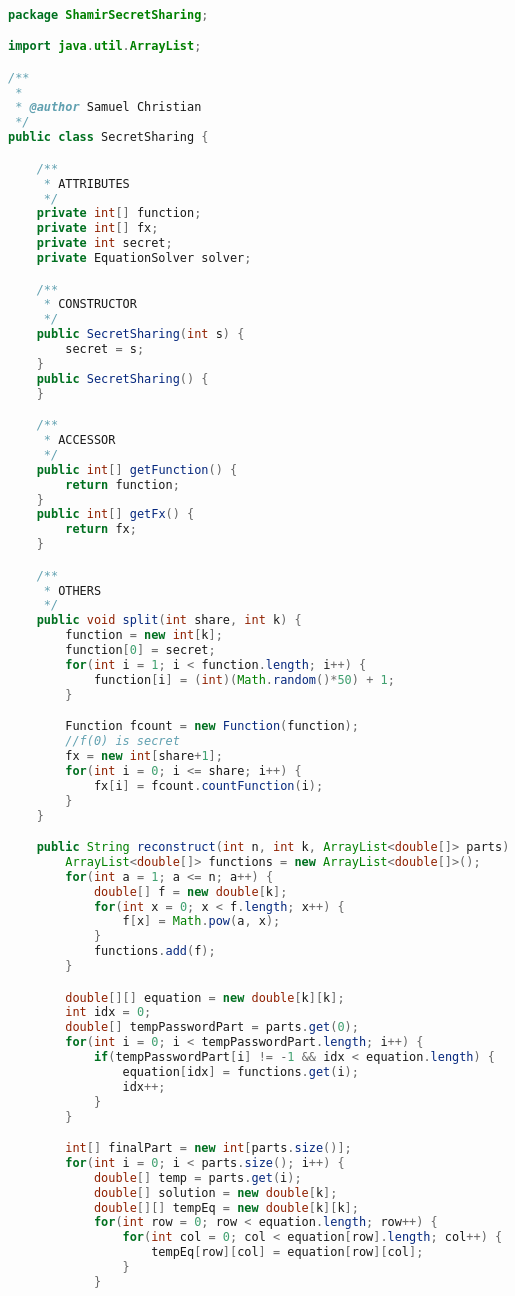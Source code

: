 \begin{lstlisting}[language=Java,basicstyle=\tiny,caption=SecretSharing.java]

package ShamirSecretSharing;

import java.util.ArrayList;

/**
 *
 * @author Samuel Christian
 */
public class SecretSharing {

    /**
     * ATTRIBUTES
     */
    private int[] function;
    private int[] fx;
    private int secret;
    private EquationSolver solver;

    /**
     * CONSTRUCTOR
     */
    public SecretSharing(int s) {
        secret = s;
    }
    public SecretSharing() {
    }

    /**
     * ACCESSOR
     */
    public int[] getFunction() {
        return function;
    }
    public int[] getFx() {
        return fx;
    }

    /**
     * OTHERS
     */
    public void split(int share, int k) {
        function = new int[k];
        function[0] = secret;
        for(int i = 1; i < function.length; i++) {
            function[i] = (int)(Math.random()*50) + 1;
        }

        Function fcount = new Function(function);
        //f(0) is secret
        fx = new int[share+1];
        for(int i = 0; i <= share; i++) {
            fx[i] = fcount.countFunction(i);
        }
    }

    public String reconstruct(int n, int k, ArrayList<double[]> parts) {
        ArrayList<double[]> functions = new ArrayList<double[]>();
        for(int a = 1; a <= n; a++) {
            double[] f = new double[k];
            for(int x = 0; x < f.length; x++) {
                f[x] = Math.pow(a, x);
            }
            functions.add(f);
        }

        double[][] equation = new double[k][k];
        int idx = 0;
        double[] tempPasswordPart = parts.get(0);
        for(int i = 0; i < tempPasswordPart.length; i++) {
            if(tempPasswordPart[i] != -1 && idx < equation.length) {
                equation[idx] = functions.get(i);
                idx++;
            }
        }

        int[] finalPart = new int[parts.size()];
        for(int i = 0; i < parts.size(); i++) {
            double[] temp = parts.get(i);
            double[] solution = new double[k];
            double[][] tempEq = new double[k][k];
            for(int row = 0; row < equation.length; row++) {
                for(int col = 0; col < equation[row].length; col++) {
                    tempEq[row][col] = equation[row][col];
                }
            }


\end{lstlisting}
